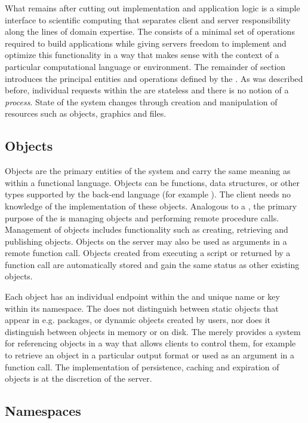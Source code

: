 What remains after cutting out implementation and application logic is a simple interface to scientific computing that separates client and server responsibility along the lines of domain expertise. The \OpenCPU \API consists of a minimal set of operations required to build applications while giving servers freedom to implement and optimize this functionality in a way that makes sense with the context of a particular computational language or environment. The remainder of section introduces the principal entities and operations defined by the \API. As was described before, individual requests within the \OpenCPU \API are stateless and there is no notion of a \emph{process}. State of the system changes through creation and manipulation of resources such as objects, graphics and files. 

\subsection{Objects}

Objects are the primary entities of the system and carry the same meaning as within a functional language. Objects can be functions, data structures, or other types supported by the back-end language (for example \R). The client needs no knowledge of the implementation of these objects. Analogous to a \CLI, the primary purpose of the \API is managing objects and performing remote procedure calls. Management of objects includes functionality such as creating, retrieving and publishing objects. Objects on the server may also be used as arguments in a remote function call. Objects created from executing a script or returned by a function call are automatically stored and gain the same status as other existing objects.

Each object has an individual endpoint within the \API and unique name or key within its namespace. The \API does not distinguish between static objects that appear in e.g. packages, or dynamic objects created by users, nor does it distinguish between objects in memory or on disk. The \API merely provides a system for referencing objects in a way that allows clients to control them, for example to retrieve an object in a particular output format or used as an argument in a function call. The implementation of persistence, caching and expiration of objects is at the discretion of the server. 

\subsection{Namespaces}


